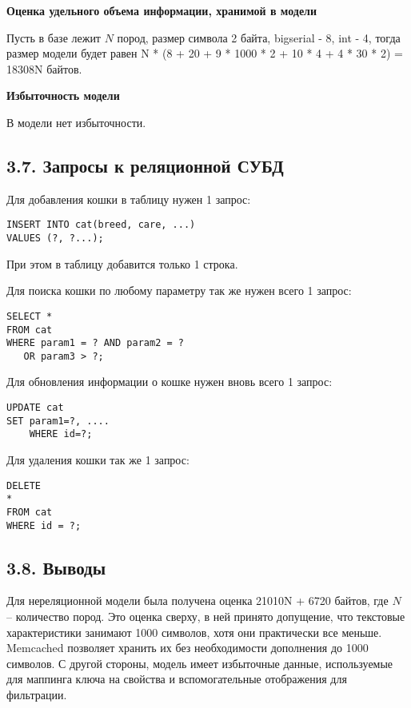 \textbf{Оценка удельного объема информации, хранимой в модели}

Пусть в базе лежит $N$ пород, размер символа 2 байта, bigserial - 8, int - 4, тогда размер модели будет равен
N * (8 + 20 + 9 * 1000 * 2 + 10 * 4 + 4 * 30 * 2) = 18308N байтов.

\textbf{Избыточность модели}

В модели нет избыточности.

\subsection*{3.7. Запросы к реляционной СУБД}
Для добавления кошки в таблицу нужен 1 запрос:

\begin{lstlisting}
INSERT INTO cat(breed, care, ...)
VALUES (?, ?...);
\end{lstlisting}

При этом в таблицу добавится только 1 строка.

Для поиска кошки по любому параметру так же нужен всего 1 запрос:

\begin{lstlisting}
SELECT *
FROM cat
WHERE param1 = ? AND param2 = ?
   OR param3 > ?;
\end{lstlisting}

Для обновления информации о кошке нужен вновь всего 1 запрос:

\begin{lstlisting}
UPDATE cat
SET param1=?, ....
    WHERE id=?;
\end{lstlisting}

Для удаления кошки так же 1 запрос:

\begin{lstlisting}
DELETE
*
FROM cat
WHERE id = ?;
\end{lstlisting}

\subsection*{3.8. Выводы}
Для нереляционной модели была получена оценка 21010N + 6720 байтов, где $N$ -- количество пород.
Это оценка сверху, в ней принято допущение, что текстовые характеристики занимают 1000 символов, хотя они практически
все меньше.
Memcached позволяет хранить их без необходимости дополнения до 1000 символов.
С другой стороны, модель имеет избыточные данные, используемые для маппинга ключа на свойства и вспомогательные отображения
для фильтрации.

